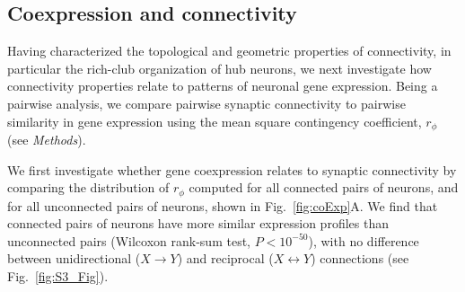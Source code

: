 \documentclass[10pt,letterpaper]{article}
\begin{document}
\subsection*{Coexpression and connectivity}

Having characterized the topological and geometric properties of connectivity, in particular the rich-club organization of hub neurons, we next investigate how connectivity properties relate to patterns of neuronal gene expression.
Being a pairwise analysis, we compare pairwise synaptic connectivity to pairwise similarity in gene expression using the mean square contingency coefficient, $r_\phi$ (see \emph{Methods}).

We first investigate whether gene coexpression relates to synaptic connectivity by comparing the distribution of $r_\phi$ computed for all connected pairs of neurons, and for all unconnected pairs of neurons, shown in Fig.~\ref{fig:coExp}A.
We find that connected pairs of neurons have more similar expression profiles than unconnected pairs (Wilcoxon rank-sum test, $P < 10^{-50}$), with no difference between unidirectional ($X \rightarrow Y$) and reciprocal ($X \leftrightarrow Y$) connections (see Fig.~\ref{fig:S3_Fig}).
\end{document}
